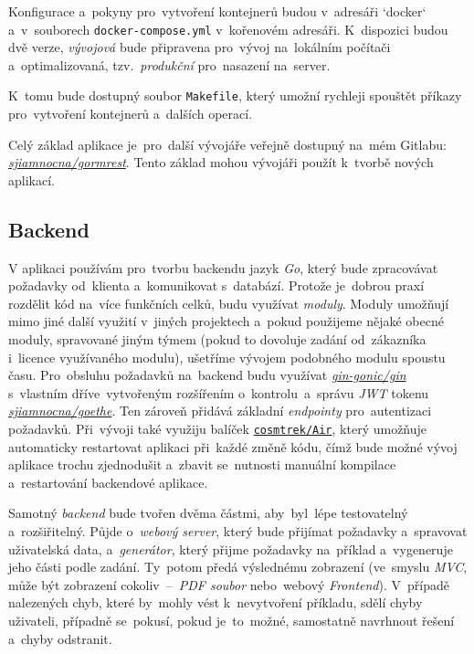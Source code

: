 \documentclass[10pt,a4paper]{article}
\begin{document}
        Konfigurace a~pokyny pro~vytvoření kontejnerů budou v~adresáři `docker` a~v~souborech \texttt{docker-compose.yml} v~kořenovém adresáři. K~dispozici budou dvě verze, \emph{vývojová} bude připravena pro~vývoj na~lokálním počítači a~optimalizovaná, tzv.~\emph{produkční} pro~nasazení na~server.

        K~tomu bude dostupný soubor \texttt{Makefile}, který umožní rychleji spouštět příkazy pro~vytvoření kontejnerů a~dalších operací.

        Celý základ aplikace je~pro~další vývojáře veřejně dostupný na~mém Gitlabu: \href{https://gitlab.com/sjiamnocna/gormrest}{\emph{sjiamnocna/gormrest}}. Tento základ mohou vývojáři použít k~tvorbě nových aplikací.
        
        \subsection{Backend}
            V aplikaci používám pro~tvorbu backendu jazyk \emph{Go}, který bude zpracovávat požadavky od~klienta a~komunikovat s~databází.
            Protože je~dobrou praxí rozdělit kód na~více funkčních celků, budu využívat \emph{moduly}. Moduly umožňují mimo jiné další využití v~jiných projektech a~pokud použijeme nějaké obecné moduly, spravované jiným týmem (pokud to dovoluje zadání od~zákazníka i~licence využívaného modulu), ušetříme vývojem podobného modulu spoustu času. \cite{Zimmerman2023:howtowritebetter}
            Pro~obsluhu požadavků na~backend budu využívat \href{https://github.com/gin-gonic/gin}{\emph{gin-gonic/gin}} s~vlastním dříve~vytvořeným rozšířením o~kontrolu~a~správu \emph{JWT} tokenu \href{https://gitlab.com/sjiamnocna/goethe}{\emph{sjiamnocna/goethe}}. Ten zároveň přidává základní \emph{endpointy} pro~autentizaci požadavků.
            Při~vývoji také využiju balíček \href{https://github.com/cosmtrek/air}{\texttt{cosmtrek/Air}}, který umožňuje automaticky restartovat aplikaci při~každé změně kódu, čímž bude možné vývoj aplikace trochu zjednodušit a~zbavit se~nutnosti manuální kompilace a~restartování backendové aplikace.

            Samotný \emph{backend} bude tvořen dvěma částmi, aby~byl~lépe testovatelný a~rozšiřitelný. Půjde o~\emph{webový server}, který bude přijímat požadavky a~spravovat uživatelská data, a~\emph{generátor}, který přijme požadavky na~příklad a~vygeneruje jeho části podle zadání. Ty~potom předá výslednému zobrazení (ve~smyslu \emph{MVC}, může být zobrazení cokoliv~--~\emph{PDF soubor} nebo~webový \emph{Frontend}). V~případě nalezených chyb, které by~mohly vést k~nevytvoření příkladu, sdělí chyby uživateli, případně se~pokusí, pokud je~to~možné, samostatně navrhnout řešení a~chyby odstranit.
\end{document}
